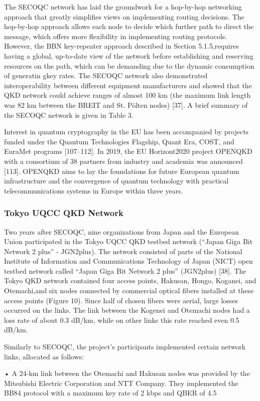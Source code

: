 The SECOQC network has laid the groundwork for a hop-by-hop networking approach that greatly simplifies views on implementing routing decisions. The hop-by-hop approach allows each node to decide which further path to direct the message, which offers more flexibility in implementing routing protocols. However, the BBN key-repeater approach described in Section 5.1.5,requires having a global, up-to-date view of the network before establishing and reserving resources on the path, which can be demanding due to the dynamic consumption of generatin gkey rates. The SECOQC network also demonstrated interoperability between different equipment manufacturers and showed that the QKD network could achieve ranges of almost 100 km (the maximum link length was 82 km between the BREIT and St. Pölten nodes) [37]. A brief summary of the SECOQC network is given in Table 3.

Interest in quantum cryptography in the EU has been accompanied by projects funded under the Quantum Technologies Flagship, Quant Era, COST, and EuraMet programs [107–112]. In 2019, the EU Horizont2020 project OPENQKD with a consortium of 38 partners from industry and academia was announced [113]. OPENQKD aims to lay the foundations for future European quantum infrastructure and the convergence of quantum technology with practical telecommunications systems in Europe within three years.
\subsubsection*{Tokyo UQCC QKD Network}
Two years after SECOQC, nine organizations from Japan and the European Union participated in the Tokyo UQCC QKD testbed network (“Japan Giga Bit Network 2 plus” - JGN2plus). The network consisted of parts of the National Institute of Information and Communications Technology of Japan (NICT) open testbed network called “Japan Giga Bit Network 2 plus” (JGN2plus) [38].
The Tokyo QKD network contained four access points, Hakusan, Hongo, Koganei, and Otemachi,and six nodes connected by commercial optical fibers installed at these access points (Figure 10).
Since half of chosen fibers were aerial, large losses occurred on the links. The link between the Kogenei and Otemachi nodes had a loss rate of about 0.3 dB/km, while on other links this rate reached even 0.5 dB/km.

Similarly to SECOQC, the project’s participants implemented certain network links, allocated as follows:

• A 24-km link between the Otemachi and Hakusan nodes was provided by the Mitsubishi Electric Corporation and NTT Company. They implemented the BB84 protocol with a maximum key rate of 2 kbps and QBER of 4.5%


